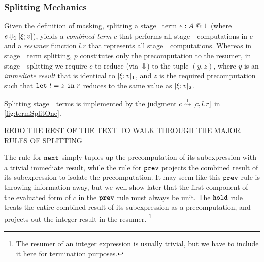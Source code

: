 
\subsubsection{Splitting Mechanics}

Given the definition of masking, splitting a stage \bbone\ term ${e}:{A}~@~ 1$ 
(where $e\mathbin{{\Downarrow_{ 1}}}[\xi;v]$), yields a \emph{combined term}
$c$ that performs all stage~\bbone\ computations in $e$ and a \emph{resumer} function $l.r$ that represents all stage~\bbtwo\ computations.
Whereas in stage~\bbtwo\ term splitting,
$p$ constitutes only the precomputation to the resumer, in stage~\bbone\ splitting we require $c$ to reduce (via~${\Downarrow}$) to the tuple $(y,z)$, where $y$ is an \emph{immediate result} that is identical to $|\xi;v|_{ 1}$, and $z$ is the required precomputation such that ${\tt let}~{l} = {z}~{\tt in}~{r}$ reduces to the same value as $|\xi;v|_{ 2}$. 

Splitting stage~\bbone\ terms is implemented by the judgment $e \overset{ 1}\rightsquigarrow [c,l.r]$ in \ref{fig:termSplitOne}. 




\TODO REDO THE REST OF THE TEXT TO WALK THROUGH THE MAJOR RULES OF SPLITTING

The rule for ${\tt next}$ simply tuples up the precomputation of its subexpression with a trivial immediate result,
while the rule for ${\tt prev}$ projects the combined result of its subexpression to isolate the precomputation.
It may seem like this ${\tt prev}$ rule is throwing information away, but we well show later that the first component 
of the evaluated form of $c$ in the ${\tt prev}$ rule must always be unit.
The ${\tt hold}$ rule treats the entire combined result of its subexpression as a precomputation, 
and projects out the integer result in the resumer.%
\footnote{The resumer of an integer expression is usually trivial, 
but we have to include it here for termination purposes.}


